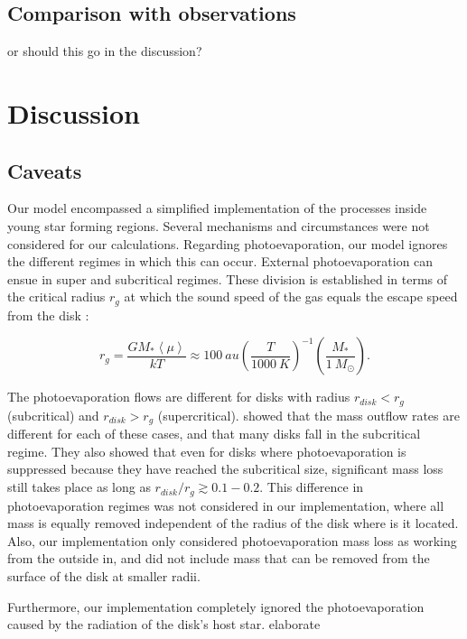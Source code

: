 \documentclass[fleqn,usenatbib]{mnras}
\newcommand\note[1]{{\colorbox{yellow!60}{\color{magenta}#1}}}
\begin{document}
\subsection{Comparison with observations}
\note{or should this go in the discussion?}

\section{Discussion}
\label{sec:discussion}

\subsection{Caveats}
Our model encompassed a simplified implementation of the processes inside young star forming regions. Several mechanisms and circumstances were not considered for our calculations. Regarding photoevaporation, our model ignores the different regimes in which this can occur. External photoevaporation can ensue in super and subcritical regimes. These division is established in terms of the critical radius $r_g$ at which the sound speed of the gas equals the escape speed from the disk \citep{adams2004}:

\begin{equation}
r_g = \frac{GM_*\left\langle\mu\right\rangle}{kT} \approx \SI{100}{au} \left(\frac{T}{\SI{1000}{K}}\right)^{-1}\left(\frac{M_*}{\SI{1}{M_\odot}}\right).
\end{equation}

The photoevaporation flows are different for disks with radius $r_{disk} < r_g$ (subcritical) and $r_{disk} > r_g$ (supercritical). \citet{adams2004} showed that the mass outflow rates are different for each of these cases, and that many disks fall in the subcritical regime. They also showed that even for disks where photoevaporation is suppressed because they have reached the subcritical size, significant mass loss still takes place as long as $r_{disk}/r_g \gtrsim 0.1-0.2$. This difference in photoevaporation regimes was not considered in our implementation, where all mass is equally removed independent of the radius of the disk where is it located. Also, our implementation only considered photoevaporation mass loss as working from the outside in, and did not include mass that can be removed from the surface of the disk at smaller radii. 

Furthermore, our implementation completely ignored the photoevaporation caused by the radiation of the disk's host star. \note{elaborate} \citep{fatuzzo2008}
\end{document}
